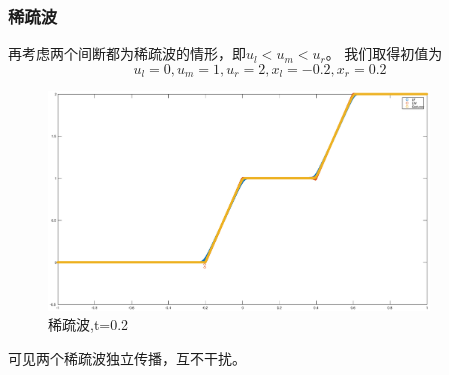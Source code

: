 \documentclass[a4paper,  11pt]{ctexart}
\begin{document}
\subsubsection{稀疏波}
再考虑两个间断都为稀疏波的情形，即$u_l < u_m < u_r$。
我们取得初值为
\[  u_l = 0, u_m = 1, u_r = 2, x_l = -0.2 , x_r= 0.2\]
\begin{figure}[H]
  \centering  
\includegraphics[width=0.9\textwidth]{./images/Burgers_0-1-2_tpt2.eps}
  \caption{稀疏波,t=0.2}
\end{figure}
可见两个稀疏波独立传播，互不干扰。
\end{document}
